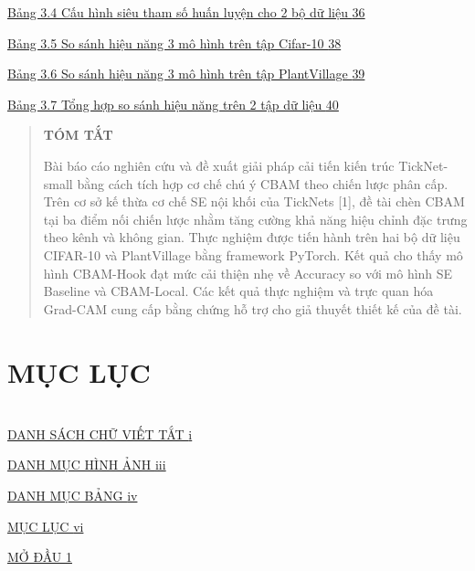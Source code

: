 \documentclass[
  12pt,
  a4paper,
]{report}
\begin{document}
\hyperref[_Toc236751809]{Bảng 3.4 Cấu hình siêu tham số huấn luyện cho 2
bộ dữ liệu \hyperref[_Toc236751809]{36}}

\hyperref[_Toc236751810]{Bảng 3.5 So sánh hiệu năng 3 mô hình trên tập
Cifar-10 \hyperref[_Toc236751810]{38}}

\hyperref[_Toc236751811]{Bảng 3.6 So sánh hiệu năng 3 mô hình trên tập
PlantVillage \hyperref[_Toc236751811]{39}}

\hyperref[_Toc236751812]{Bảng 3.7 Tổng hợp so sánh hiệu năng trên 2 tập
dữ liệu \hyperref[_Toc236751812]{40}}

\begin{quote}
\textbf{TÓM TẮT}

Bài báo cáo nghiên cứu và đề xuất giải pháp cải tiến kiến trúc
TickNet-small bằng cách tích hợp cơ chế chú ý CBAM theo chiến lược phân
cấp. Trên cơ sở kế thừa cơ chế SE nội khối của TickNets {[}1{]}, đề tài
chèn CBAM tại ba điểm nối chiến lược nhằm tăng cường khả năng hiệu chỉnh
đặc trưng theo kênh và không gian. Thực nghiệm được tiến hành trên hai
bộ dữ liệu CIFAR-10 và PlantVillage bằng framework PyTorch. Kết quả cho
thấy mô hình CBAM-Hook đạt mức cải thiện nhẹ về Accuracy so với mô hình
SE Baseline và CBAM-Local. Các kết quả thực nghiệm và trực quan hóa
Grad-CAM cung cấp bằng chứng hỗ trợ cho giả thuyết thiết kế của đề tài.
\end{quote}

\chapter*{MỤC LỤC}\label{mux1ee5c-lux1ee5c}

\chapter*{}\label{section}

\hyperref[danh-suxe1ch-chux1eef-viux1ebft-tux1eaft]{DANH SÁCH CHỮ VIẾT
TẮT \hyperref[danh-suxe1ch-chux1eef-viux1ebft-tux1eaft]{i}}

\hyperref[danh-mux1ee5c-huxecnh-ux1ea3nh]{DANH MỤC HÌNH ẢNH
\hyperref[danh-mux1ee5c-huxecnh-ux1ea3nh]{iii}}

\hyperref[danh-mux1ee5c-bux1ea3ng]{DANH MỤC BẢNG
\hyperref[danh-mux1ee5c-bux1ea3ng]{iv}}

\hyperref[mux1ee5c-lux1ee5c]{MỤC LỤC \hyperref[mux1ee5c-lux1ee5c]{vi}}

\hyperref[mux1edf-ux111ux1ea7u]{MỞ ĐẦU
\hyperref[mux1edf-ux111ux1ea7u]{1}}
\end{document}
